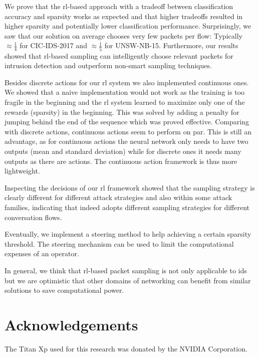 \documentclass[conference]{IEEEtran}
\begin{document}
We prove that the \gls{rl}-based approach with a tradeoff between classification accuracy and sparsity works as expected and that higher tradeoffs resulted in higher sparsity and potentially lower classification performance. Surprisingly, we saw that our solution \ours{} on average chooses very few packets per flow: Typically $\approx \frac{1}{4}$ for CIC-IDS-2017 and $\approx \frac{1}{5}$ for UNSW-NB-15. Furthermore, our results showed that \gls{rl}-based sampling can intelligently choose relevant packets for intrusion detection and outperform non-smart sampling techniques.

Besides discrete actions for our \gls{rl} system we also implemented continuous ones. We showed that a naive implementation would not work as the training is too fragile in the beginning and the \gls{rl} system learned to maximize only one of the rewards (sparsity) in the beginning. This was solved by adding a penalty for jumping behind the end of the sequence which was proved effective. Comparing with discrete actions, continuous actions seem to perform on par. This is still an advantage, as for continuous actions the neural network only needs to have two outputs (mean and standard deviation) while for discrete ones it needs many outputs as there are actions. The continuous action framework is thus more lightweight.

Inspecting the decisions of our \gls{rl} framework showed that the sampling strategy is clearly different for different attack strategies and also within some attack families, indicating that \ours{} indeed adopts different sampling strategies for different conversation flows.  

Eventually, we implement a steering method to help achieving a certain sparsity threshold. The steering mechanism can be used to limit the computational expenses of an operator.

In general, we think that \gls{rl}-based packet sampling is not only applicable to \gls{ids} but we are optimistic that other domains of networking can benefit from similar solutions to save computational power. 

\section*{Acknowledgements}
The Titan Xp used for this research was donated by the NVIDIA Corporation.

\renewcommand*{\bibfont}{\small}


\end{document}
